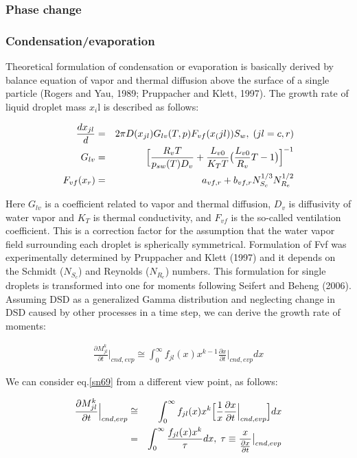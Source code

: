 \subsubsection{Phase change}
\subsubsection{Condensation/evaporation}
Theoretical formulation of condensation or evaporation is basically derived by balance equation of vapor and thermal diffusion above the surface of a single particle (Rogers and Yau, 1989; Pruppacher and Klett, 1997). The growth rate of liquid droplet mass $x_{i}$l is described as follows:

\begin{eqnarray}
\frac{dx_{jl}}{d}&=&2\pi D(x_{jl})G_{lv}(T,p)F_{vf}(x_(jl))S_{w},\; (jl=c,r)\label{sn66}\\
G_{lv}&=&\Bigl[\frac{R_{v}T}{p_{sw}(T)D_{v}}+\frac{L_{v0}}{K_{T}T}\bigl(\frac{L_{v0}}{R_{v}}{T}-1\bigr)\Bigr]^{-1}\label{sn67}\\
F_{vf}(x_{r})&=&a_{vf,r}+b_{vf,r}N_{S_{c}}^{1/3}N_{R_{e}}^{1/2}\label{sn68}
\end{eqnarray}

Here $G_{lv}$ is a coefficient related to vapor and thermal diffusion, $D_{v}$ is diffusivity of water vapor and $K_{T}$ is thermal conductivity, and $F_{vf}$ is the so-called ventilation coefficient. This is a correction factor for the assumption that the water vapor field surrounding each droplet is spherically symmetrical. Formulation of Fvf was experimentally determined by Pruppacher and Klett (1997) and it depends on the Schmidt ($N_{S_{c}}$) and Reynolds ($N_{R_{e}}$) numbers. This formulation for single droplets is transformed into one for moments following Seifert and Beheng (2006). Assuming DSD as a generalized Gamma distribution and neglecting change in DSD caused by other processes in a time step, we can derive the growth rate of moments:

\begin{eqnarray}
\frac{\partial M_{jl}^{k}}{\partial t}\Bigr|_{cnd,evp}\cong \int_{0}^{\infty}f_{jl}(x)x^{k-1}\frac{\partial x}{\partial t}\Bigr|_{cnd,evp}dx\label{sn69}
\end{eqnarray}

We can consider eq.\ref{sn69} from a different view point, as follows:

\begin{eqnarray}
\frac{\partial M_{jl}^{k}}{\partial t}\Bigr|_{cnd,evp}&\cong& \int_{0}^{\infty}f_{jl}(x)x^{k}\Bigl[\frac{1}{x}\frac{\partial x}{\partial t}\Bigr|_{cnd,evp}\Bigr]dx\nonumber\\
&=&\int_{0}^{\infty}\frac{f_{jl}(x)x^{k}}{\tau}dx,\;\tau\equiv\frac{x}{\frac{\partial x}{\partial t}}\bigr|_{cnd,evp}\label{sn70}
\end{eqnarray}

